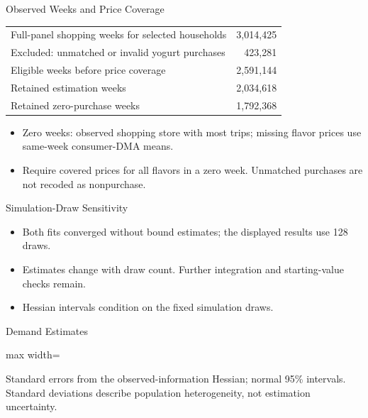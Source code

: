 \gdef\shortbuttons{\hyperlink{short-demand-fit}{\beamergotobutton{Back to Fit}}}
\begin{frame}[label=short-calendar-coverage,noframenumbering]{Observed Weeks and Price Coverage}
  \centering\small
  \begin{tabular}{lr}\toprule
    Full-panel shopping weeks for selected households & 3,014,425\\
    Excluded: unmatched or invalid yogurt purchases & 423,281\\
    Eligible weeks before price coverage & 2,591,144\\
    Retained estimation weeks & 2,034,618\\
    Retained zero-purchase weeks & 1,792,368\\\bottomrule
  \end{tabular}
  \begin{itemize}
    \item Zero weeks: observed shopping store with most trips; missing flavor prices use same-week consumer-DMA means.
    \item Require covered prices for all flavors in a zero week. Unmatched purchases are not recoded as nonpurchase.
  \end{itemize}
\end{frame}

\gdef\shortbuttons{\hyperlink{short-demand-fit}{\beamergotobutton{Back to Fit}}}
\begin{frame}[label=short-draw-sensitivity,noframenumbering]{Simulation-Draw Sensitivity}
  \centering\small
  
  \begin{itemize}
    \item Both fits converged without bound estimates; the displayed results use 128 draws.
    \item Estimates change with draw count. Further integration and starting-value checks remain.
    \item Hessian intervals condition on the fixed simulation draws.
  \end{itemize}
\end{frame}

\gdef\shortbuttons{\hyperlink{short-32}{\beamergotobutton{Back to Distributions}}}
\begin{frame}[label=short-30,noframenumbering]{Demand Estimates}
  \centering\small
  \begin{adjustbox}{max width=\linewidth}
    
  \end{adjustbox}
  \par\medskip\raggedright\footnotesize Standard errors from the observed-information Hessian; normal 95\% intervals.
  Standard deviations describe population heterogeneity, not estimation uncertainty.
\end{frame}

